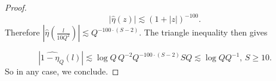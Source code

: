 \documentclass[10pt,a4paper]{amsart}
\begin{document}
\begin{proof}
    \begin{equation*}
        |\hat{\eta}(z)|\lesssim (1+|z|)^{-100}.
    \end{equation*}
    Therefore $|\hat{\eta}(\frac{l}{10Q^2})|\lesssim Q^{-100\cdot(S-2)}$. The triangle inequality then gives

    \begin{equation*}
        |\widehat{1-\eta_Q}(l)| \lesssim \log Q\,Q^{-2}Q^{-100\cdot(S-2)} S Q\lesssim \log Q Q^{-1}, \, S\geq 10.
    \end{equation*}
    So in any case, we conclude.
\end{proof}
\end{document}
